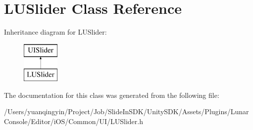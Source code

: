 \hypertarget{interface_l_u_slider}{}\section{L\+U\+Slider Class Reference}
\label{interface_l_u_slider}
Inheritance diagram for L\+U\+Slider\+:\begin{figure}[H]
\begin{center}
\leavevmode
\includegraphics[height=2.000000cm]{interface_l_u_slider}
\end{center}
\end{figure}


The documentation for this class was generated from the following file\+:\begin{DoxyCompactItemize}
\item 
/\+Users/yuanqingyin/\+Project/\+Job/\+Slide\+In\+S\+D\+K/\+Unity\+S\+D\+K/\+Assets/\+Plugins/\+Lunar\+Console/\+Editor/i\+O\+S/\+Common/\+U\+I/L\+U\+Slider.\+h\end{DoxyCompactItemize}
